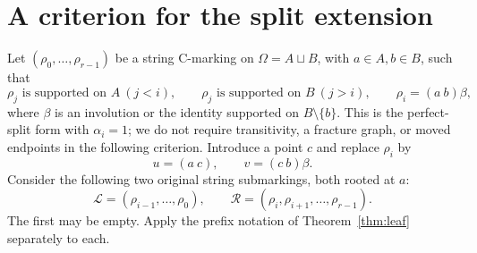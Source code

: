 \documentclass[a4paper,11pt]{article}
\begin{document}
\section{A criterion for the split extension}
Let $(\rho_0,\ldots,\rho_{r-1})$ be a string C-marking on
$\Omega=A\sqcup B$, with $a\in A,b\in B$, such that
\begin{equation}\label{eq:split}
 \rho_j\text{ is supported on }A\ (j<i),\qquad
 \rho_j\text{ is supported on }B\ (j>i),\qquad
 \rho_i=(a\ b)\beta,
\end{equation}
where $\beta$ is an involution or the identity supported on $B\setminus\{b\}$.
This is the perfect-split form with $\alpha_i=1$; we do not require
transitivity, a fracture graph, or moved endpoints in the following criterion.
Introduce a point $c$ and replace $\rho_i$ by
\[
 u=(a\ c),\qquad v=(c\ b)\beta.
\]
Consider the following two original string submarkings, both rooted at $a$:
\[
 \mathcal L=(\rho_{i-1},\ldots,\rho_0),\qquad
 \mathcal R=(\rho_i,\rho_{i+1},\ldots,\rho_{r-1}).
\]
The first may be empty. Apply the prefix notation of
Theorem~\ref{thm:leaf} separately to each.
\end{document}
